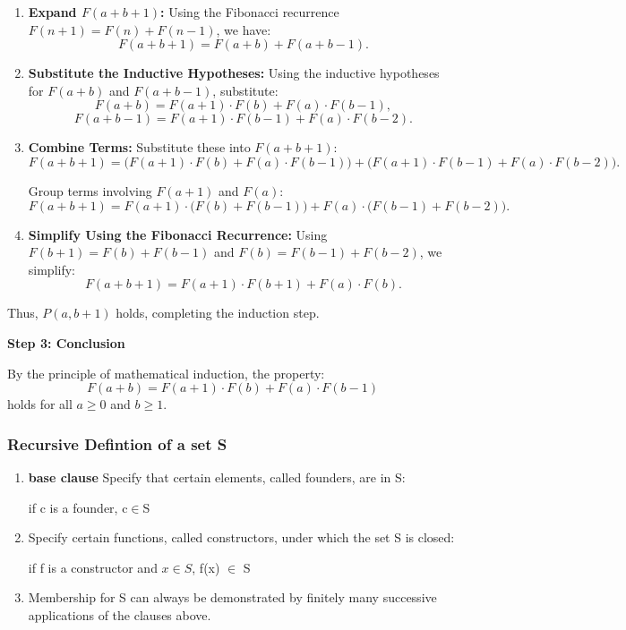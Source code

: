 \documentclass{article}
\begin{document}
\begin{enumerate}
    \item \textbf{Expand \( F(a+b+1) \):}
    Using the Fibonacci recurrence \( F(n+1) = F(n) + F(n-1) \), we have:
    \[
    F(a+b+1) = F(a+b) + F(a+b-1).
    \]

    \item \textbf{Substitute the Inductive Hypotheses:}
    Using the inductive hypotheses for \( F(a+b) \) and \( F(a+b-1) \), substitute:
    \[
    F(a+b) = F(a+1) \cdot F(b) + F(a) \cdot F(b-1),
    \]
    \[
    F(a+b-1) = F(a+1) \cdot F(b-1) + F(a) \cdot F(b-2).
    \]

    \item \textbf{Combine Terms:}
    Substitute these into \( F(a+b+1) \):
    \[
    F(a+b+1) = \big(F(a+1) \cdot F(b) + F(a) \cdot F(b-1)\big) + \big(F(a+1) \cdot F(b-1) + F(a) \cdot F(b-2)\big).
    \]

    Group terms involving \( F(a+1) \) and \( F(a) \):
    \[
    F(a+b+1) = F(a+1) \cdot \big(F(b) + F(b-1)\big) + F(a) \cdot \big(F(b-1) + F(b-2)\big).
    \]

    \item \textbf{Simplify Using the Fibonacci Recurrence:}
    Using \( F(b+1) = F(b) + F(b-1) \) and \( F(b) = F(b-1) + F(b-2) \), we simplify:
    \[
    F(a+b+1) = F(a+1) \cdot F(b+1) + F(a) \cdot F(b).
    \]
\end{enumerate}

Thus, \( P(a, b+1) \) holds, completing the induction step.

\textbf{Step 3: Conclusion}

By the principle of mathematical induction, the property:
\[
F(a+b) = F(a+1) \cdot F(b) + F(a) \cdot F(b-1)
\]
holds for all \( a \geq 0 \) and \( b \geq 1 \).



\subsubsection{Recursive Defintion of a set S}
\begin{enumerate}
    \item \textbf{base clause} Specify that certain elements, called founders, are in S:
    \begin{center}
        if c is a founder, c$\in$S
    \end{center}
    \item Specify certain functions, called constructors, under which the set S is closed:
    \begin{center}
        if f is a constructor and $x\in S$, f(x) $\in$ S
    \end{center}
    \item Membership for S can always be demonstrated by finitely many successive applications of the clauses above.
\end{enumerate}
\end{document}

